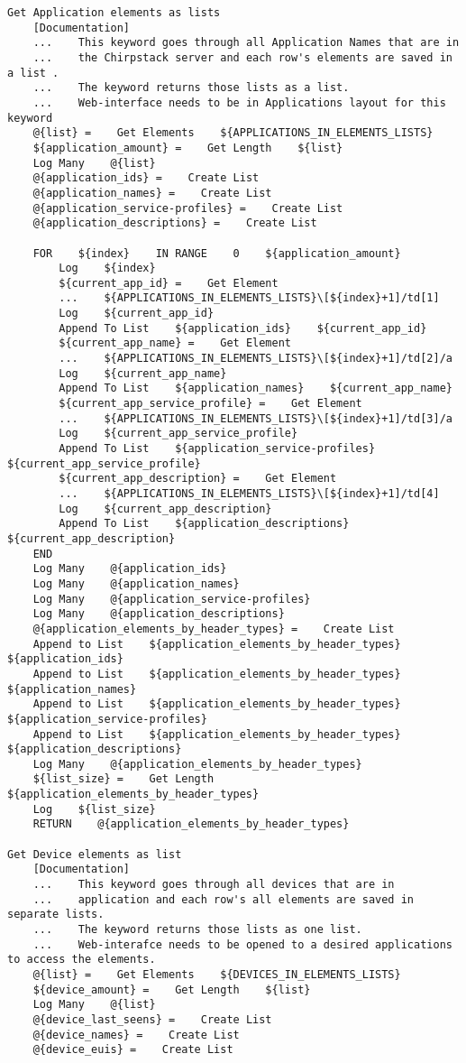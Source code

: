 \begin{verbatim}
Get Application elements as lists
    [Documentation]
    ...    This keyword goes through all Application Names that are in
    ...    the Chirpstack server and each row's elements are saved in a list .
    ...    The keyword returns those lists as a list.
    ...    Web-interface needs to be in Applications layout for this keyword
    @{list} =    Get Elements    ${APPLICATIONS_IN_ELEMENTS_LISTS}
    ${application_amount} =    Get Length    ${list}
    Log Many    @{list}
    @{application_ids} =    Create List
    @{application_names} =    Create List
    @{application_service-profiles} =    Create List
    @{application_descriptions} =    Create List

    FOR    ${index}    IN RANGE    0    ${application_amount}
        Log    ${index}
        ${current_app_id} =    Get Element
        ...    ${APPLICATIONS_IN_ELEMENTS_LISTS}\[${index}+1]/td[1]
        Log    ${current_app_id}
        Append To List    ${application_ids}    ${current_app_id}
        ${current_app_name} =    Get Element
        ...    ${APPLICATIONS_IN_ELEMENTS_LISTS}\[${index}+1]/td[2]/a
        Log    ${current_app_name}
        Append To List    ${application_names}    ${current_app_name}
        ${current_app_service_profile} =    Get Element
        ...    ${APPLICATIONS_IN_ELEMENTS_LISTS}\[${index}+1]/td[3]/a
        Log    ${current_app_service_profile}
        Append To List    ${application_service-profiles}    ${current_app_service_profile}
        ${current_app_description} =    Get Element
        ...    ${APPLICATIONS_IN_ELEMENTS_LISTS}\[${index}+1]/td[4]
        Log    ${current_app_description}
        Append To List    ${application_descriptions}    ${current_app_description}
    END
    Log Many    @{application_ids}
    Log Many    @{application_names}
    Log Many    @{application_service-profiles}
    Log Many    @{application_descriptions}
    @{application_elements_by_header_types} =    Create List
    Append to List    ${application_elements_by_header_types}    ${application_ids}
    Append to List    ${application_elements_by_header_types}    ${application_names}
    Append to List    ${application_elements_by_header_types}    ${application_service-profiles}
    Append to List    ${application_elements_by_header_types}    ${application_descriptions}
    Log Many    @{application_elements_by_header_types}
    ${list_size} =    Get Length    ${application_elements_by_header_types}
    Log    ${list_size}
    RETURN    @{application_elements_by_header_types}

Get Device elements as list
    [Documentation]
    ...    This keyword goes through all devices that are in
    ...    application and each row's all elements are saved in separate lists.
    ...    The keyword returns those lists as one list.
    ...    Web-interafce needs to be opened to a desired applications to access the elements.
    @{list} =    Get Elements    ${DEVICES_IN_ELEMENTS_LISTS}
    ${device_amount} =    Get Length    ${list}
    Log Many    @{list}
    @{device_last_seens} =    Create List
    @{device_names} =    Create List
    @{device_euis} =    Create List


\end{verbatim}
